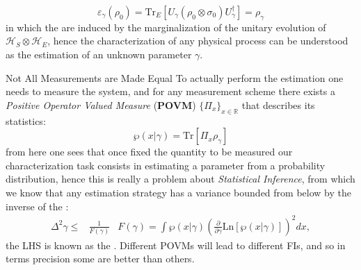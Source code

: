 \documentclass[final]{beamer}
\newlength{\colwidth}
\begin{document}
\begin{frame}[t]
\begin{columns}[t]
\begin{column}{\colwidth}
  
\vspace{-0.2\linewidth}
{\LARGE
  \begin{equation*}
       \varepsilon_{\gamma}\left(\rho_{0}\right)=\mathrm{Tr}_{E}\left[ U_{\gamma}\left( \rho_{0} \otimes \sigma_{0} \right)U_{\gamma}^{\dagger}\right]=\rho_{\gamma}
  \end{equation*}
}
in which the  are induced by the marginalization of the unitary evolution of
$\mathcal{H}_{S}\otimes\mathcal{H}_{E}$, hence the characterization of any physical process can be understood as the estimation of an unknown parameter $\gamma$.
  \begin{block}{Not All Measurements are Made Equal}
    To actually perform the estimation one needs to measure the system, and for any measurement scheme there exists a \textit{Positive
      Operator Valued Measure} (\textbf{POVM}) $\{\Pi_{x}\}_{x \in \mathbb{R}}$ that describes its statistics:
{\LARGE
  \begin{equation*}
     \wp(x | \gamma)= \mathrm{Tr}\left[\Pi_{x} \rho_{\gamma}\right]
  \end{equation*}
}
from here one sees that once fixed the quantity to be measured our characterization task consists in estimating a parameter from a probability
distribution, hence this is really a problem about \textit{Statistical Inference}, from which we know that any estimation strategy has a variance
bounded from below by the inverse of the :
{\Large
  \begin{align*}
    \Delta^{2}\gamma \leq & \frac{1}{F(\gamma)} & F(\gamma) = \int  \wp(x | \gamma) \left(\frac{\partial}{\partial\gamma} \mathrm{Ln}  [\wp(x |\gamma)]\right)^{2} dx,
  \end{align*}
}
the LHS is known as the . Different POVMs will lead to different FIs, and so in terms precision some
are better than others.
\end{block}


\end{column}
\end{columns}
\end{frame}
\end{document}
